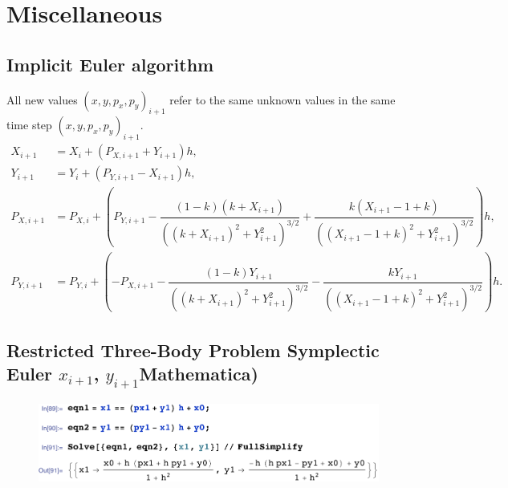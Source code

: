 \chapter{Miscellaneous} \label{app:misc}

\section{Implicit Euler algorithm} \label{app:implicit_euler}
All new values $(x,y,p_x,p_y)_{i+1}$ refer to the same unknown values in the same time step $(x,y,p_x,p_y)_{i+1}$.
\begin{align}
    X_{i+1} &= X_i + (P_{X,i+1} + Y_{i+1})h, \\[0.2cm]
    Y_{i+1} &= Y_i + (P_{Y,i+1} - X_{i+1})h , \\[0.2cm]
    P_{X,i+1} &= P_{X,i} + \left(P_{Y,i+1} - \dfrac{(1-k)(k+X_{i+1})}{((k+X_{i+1})^2+Y_{i+1}^2)^{3/2}} + \dfrac{k(X_{i+1}-1+k)}{((X_{i+1}-1+k)^2+Y_{i+1}^2)^{3/2}}\right)h, \\[0.2cm]
    P_{Y,i+1} &= P_{Y,i} + \left(-P_{X,i+1} - \dfrac{(1-k)Y_{i+1}}{((k+X_{i+1})^2+Y_{i+1}^2)^{3/2}} - \dfrac{k Y_{i+1}}{((X_{i+1}-1+k)^2+Y_{i+1}^2)^{3/2}}\right)h.
\end{align}

\section{Restricted Three-Body Problem Symplectic Euler \texorpdfstring{$x_{i+1}$, $y_{i+1}$} (Mathematica)} \label{app:r3b-symplectic-euler}
\begin{figure}[h!]
\centering 
\includegraphics[scale=0.8]{appendices/Miscellaneous/symplectic_euler_derivation.pdf}
\end{figure}

\newpage

